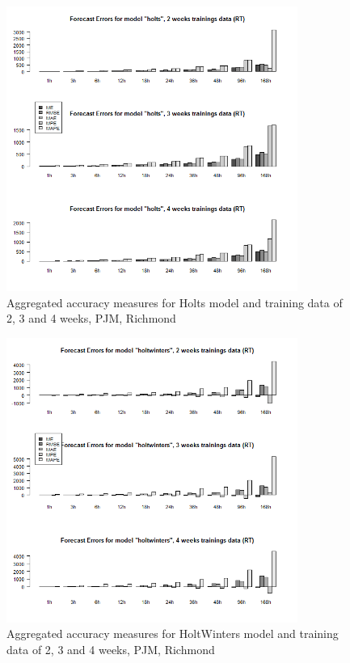 \begin{figure}[!ht]
	\centering
		\includegraphics[width=0.85\textwidth]{figures/appendix_forecast_results/rt_sim_6_x_1w_1w_holts.png}
	\caption{Aggregated accuracy measures for Holts model and training data of 2, 3 and 4 weeks, PJM, Richmond}
	\label{fig:app_rt_sim_6_x_1w_1w_holts}
	\vspace*{-1.6in}
\end{figure}




\begin{figure}[!ht]
	\centering
	\vspace*{-1.2in}
		\includegraphics[width=0.85\textwidth]{figures/appendix_forecast_results/rt_sim_6_x_1w_1w_holtwinters.png}
	\caption{Aggregated accuracy measures for HoltWinters model and training data of 2, 3 and 4 weeks, PJM, Richmond}
	\label{fig:app_rt_sim_6_x_1w_1w_holtwinters}
\end{figure}

